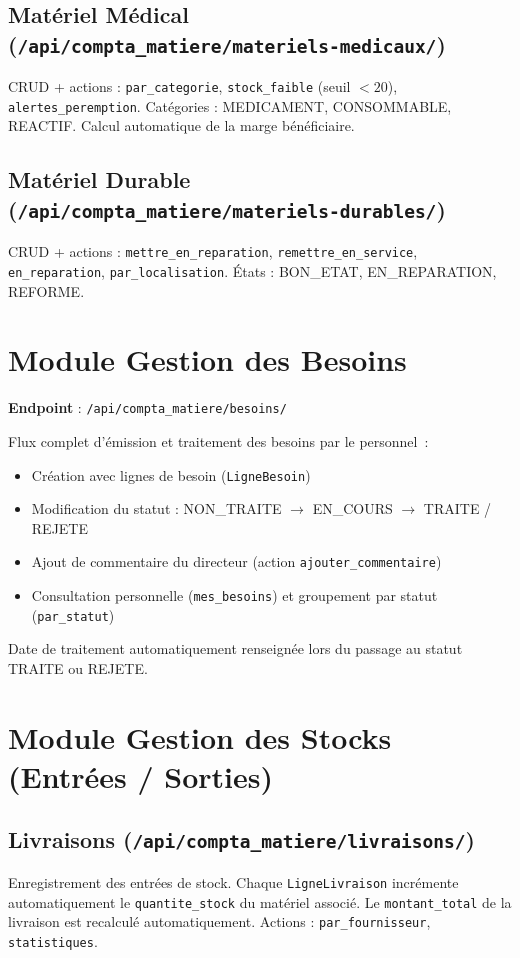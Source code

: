\documentclass[12pt,a4paper]{report}
\begin{document}
\subsection{Matériel Médical (\texttt{/api/compta\_matiere/materiels-medicaux/})}
CRUD + actions : \texttt{par\_categorie}, \texttt{stock\_faible} (seuil $< 20$), \texttt{alertes\_peremption}.
Catégories : MEDICAMENT, CONSOMMABLE, REACTIF. Calcul automatique de la marge bénéficiaire.

\subsection{Matériel Durable (\texttt{/api/compta\_matiere/materiels-durables/})}
CRUD + actions : \texttt{mettre\_en\_reparation}, \texttt{remettre\_en\_service}, \texttt{en\_reparation}, \texttt{par\_localisation}.
États : BON\_ETAT, EN\_REPARATION, REFORME.

\section{Module Gestion des Besoins}
\textbf{Endpoint} : \texttt{/api/compta\_matiere/besoins/}

Flux complet d'émission et traitement des besoins par le personnel~:
\begin{itemize}
    \item Création avec lignes de besoin (\texttt{LigneBesoin})
    \item Modification du statut : NON\_TRAITE $\rightarrow$ EN\_COURS $\rightarrow$ TRAITE / REJETE
    \item Ajout de commentaire du directeur (action \texttt{ajouter\_commentaire})
    \item Consultation personnelle (\texttt{mes\_besoins}) et groupement par statut (\texttt{par\_statut})
\end{itemize}
Date de traitement automatiquement renseignée lors du passage au statut TRAITE ou REJETE.

\section{Module Gestion des Stocks (Entrées / Sorties)}
\subsection{Livraisons (\texttt{/api/compta\_matiere/livraisons/})}
Enregistrement des entrées de stock. Chaque \texttt{LigneLivraison} incrémente automatiquement le \texttt{quantite\_stock} du matériel associé. Le \texttt{montant\_total} de la livraison est recalculé automatiquement.
Actions : \texttt{par\_fournisseur}, \texttt{statistiques}.
\end{document}
